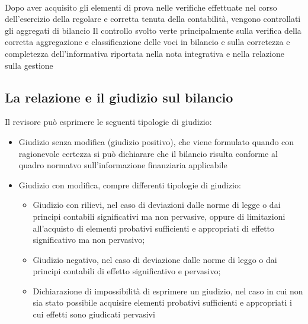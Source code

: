 \documentclass{report}
\begin{document}
\\
Dopo aver acquisito gli elementi di prova nelle verifiche effettuate nel corso dell'esercizio della regolare e corretta tenuta della contabilità, vengono controllati gli aggregati di bilancio Il controllo svolto verte principalmente sulla verifica della corretta aggregazione e classificazione delle voci in bilancio e sulla corretezza e completezza dell'informativa riportata nella nota integrativa e nella relazione sulla gestione

\subsection{La relazione e il giudizio sul bilancio} %
\label{sub:La relazione e il giudizio sul bilancio}
Il revisore può esprimere le seguenti tipologie di giudizio:
\\
\begin{itemize}
  \item{Giudizio senza modifica (giudizio positivo), che viene formulato quando con ragionevole certezza si può dichiarare che il bilancio risulta conforme al quadro normatvo sull'informazione finanziaria applicabile}
  \item{Giudizio con modifica, compre differenti tipologie di giudizio:
    \begin{itemize}
      \item{Giudizio con rilievi, nel caso di deviazioni dalle norme di legge o dai principi contabili significativi ma non pervasive, oppure di limitazioni all'acquisto di elementi probativi sufficienti e appropriati di effetto significativo ma non pervasivo;}
      \item{Giudizio negativo, nel caso di deviazione dalle norme di leggo o dai principi contabili di effetto significativo e pervasivo;}
      \item{Dichiarazione di impossibilità di esprimere un giudizio, nel caso in cui non sia stato possibile acquisire elementi probativi sufficienti e appropriati i cui effetti sono giudicati pervasivi}
    \end{itemize}}
\end{itemize}
\\
\end{document}
